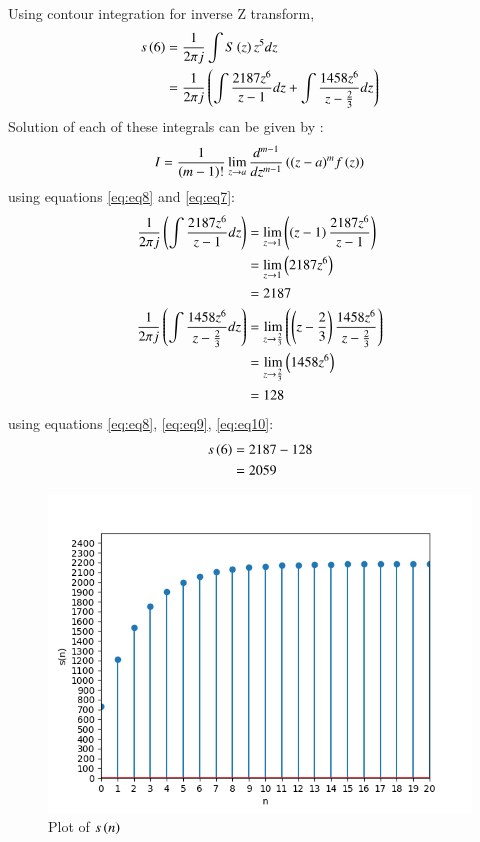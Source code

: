\documentclass[journal,12pt,twocolumn]{IEEEtran}
\theoremstyle{remark}
\begin{document}
Using contour integration for inverse Z transform,
\begin{align}
    s\left(6\right) &= \frac{1}{2\pi j}\int S\left(z\right) z^{5} dz\\
    &= \frac{1}{2\pi j}\left(\int\frac{2187z^{6}}{z-1}dz + \int\frac{1458z^{6}}{z - \frac{2}{3}} dz\right) \label{eq:eq8}
\end{align}
Solution of each of these integrals can be given by :
\begin{align}
    I =\frac{1}{\left(m-1\right)!}\lim\limits_{z\to a}\frac{d^{m-1}}{dz^{m-1}}\left({(z-a)}^{m}f\left(z\right)\right) \label{eq:eq7}
\end{align}
using equations \eqref{eq:eq8} and \eqref{eq:eq7}:
\begin{align}
    \frac{1}{2\pi j}\left(\int\frac{2187z^{6}}{z - 1}dz\right) &= \lim\limits_{z\to 1}\left(\left(z-1\right)\frac{2187z^{6}}{z-1}\right)\\
    &= \lim\limits_{z \to1}\left(2187z^{6}\right)\\
    &= 2187\label{eq:eq9}\\
     \frac{1}{2\pi j}\left(\int\frac{1458z^{6}}{z - \frac{2}{3}}dz\right) &= \lim\limits_{z\to \frac{2}{3}}\left(\left(z-\frac{2}{3}\right)\frac{1458z^{6}}{z-\frac{2}{3}}\right)\\
     &= \lim\limits_{z \to\frac{2}{3}}\left(1458z^{6}\right)\\
     &= 128\label{eq:eq10}
     \end{align}
using equations \eqref{eq:eq8}, \eqref{eq:eq9}, \eqref{eq:eq10}:
\begin{align}
s\left(6\right) &= 2187 - 128\\
&= 2059
\end{align}
\begin{figure}[!ht]
\centering
\begin{center}
\includegraphics[width=\columnwidth]{Figure_1}
\caption{Plot of $s\left(n\right)$}
\end{center}
\end{figure}
\end{document}

